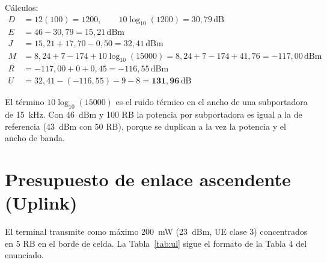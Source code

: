 \documentclass[11pt,letterpaper]{article}
\newcommand{\dB}{\,\mathrm{dB}}
\newcommand{\dBm}{\,\mathrm{dBm}}
\begin{document}
Cálculos:
\begin{align*}
D &= 12(100) = 1200, \qquad 10\log_{10}(1200) = 30{,}79\dB \\
E &= 46 - 30{,}79 = 15{,}21\dBm \\
J &= 15{,}21 + 17{,}70 - 0{,}50 = 32{,}41\dBm \\
M &= 8{,}24 + 7 - 174 + 10\log_{10}(15000) = 8{,}24 + 7 - 174 + 41{,}76 = -117{,}00\dBm \\
R &= -117{,}00 + 0 + 0{,}45 = -116{,}55\dBm \\
U &= 32{,}41 - (-116{,}55) - 9 - 8 = \mathbf{131{,}96\dB}
\end{align*}

El término $10\log_{10}(15000)$ es el ruido térmico en el ancho de una subportadora de \SI{15}{kHz}. Con \SI{46}{dBm} y 100 RB la potencia por subportadora es igual a la de referencia (\SI{43}{dBm} con 50 RB), porque se duplican a la vez la potencia y el ancho de banda.

\section{Presupuesto de enlace ascendente (Uplink)}

El terminal transmite como máximo \SI{200}{mW} (\SI{23}{dBm}, UE clase 3) concentrados en 5 RB en el borde de celda. La Tabla~\ref{tab:ul} sigue el formato de la Tabla 4 del enunciado.
\end{document}

